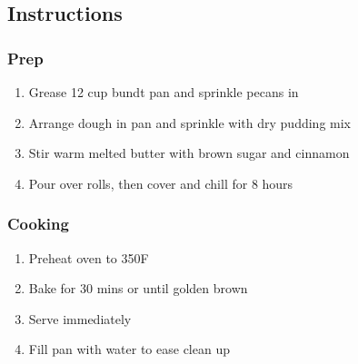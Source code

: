 \documentclass{article}
\begin{document}
\subsection{Instructions}
\subsubsection{Prep}
\begin{enumerate}
\item Grease 12 cup bundt pan and sprinkle pecans in
\item Arrange dough in pan and sprinkle with dry pudding mix
\item Stir warm melted butter with brown sugar and cinnamon
\item Pour over rolls, then cover and chill for 8 hours
\end{enumerate}
\subsubsection{Cooking}
\begin{enumerate}
\item Preheat oven to 350\degree F
\item Bake for 30 mins or until golden brown
\item Serve immediately
\item Fill pan with water to ease clean up
\end{enumerate}
\end{document}
